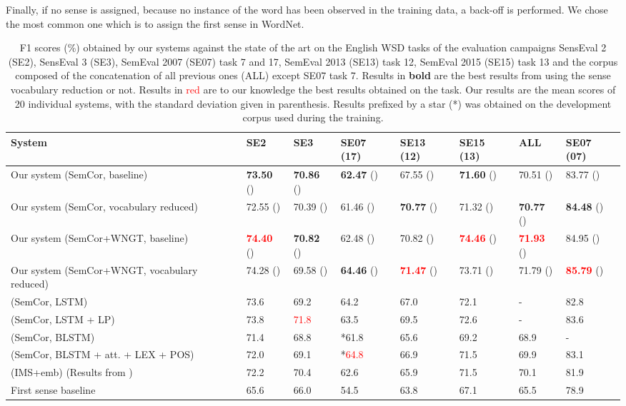\documentclass[11pt,a4paper]{article}
\newcommand{\tbf}[1]{\textbf{#1}}
\begin{document}
Finally, if no sense is assigned, because no instance of the word has been observed in the training data, a back-off is performed. We chose the most common one which is to assign the first sense in WordNet. 

\begin{table*}[htbp]
\small
\begin{center}
\tabulinesep=2pt
\begin{tabu} to \linewidth {X[5lm]X[1cm]X[1cm]X[1cm]X[1cm]X[1cm]X[1cm]X[1cm]} \toprule
System & SE2 & SE3 & SE07 (17) & SE13 (12) & SE15 (13) & ALL & SE07 (07)\\
\midrule
Our system (SemCor, baseline) & \tbf{73.50} () & \tbf{70.86} () & \tbf{62.47} () & 67.55 () & \tbf{71.60} () & 70.51 () & 83.77 ()\\
 Our system (SemCor, vocabulary reduced) & 72.55 () & 70.39 () & 61.46 () & \tbf{70.77} () & 71.32 () & \tbf{70.77} () & \tbf{84.48} () \\
\midrule
Our system (SemCor+WNGT, baseline) & \textcolor{red}{\tbf{74.40}} () & \tbf{70.82} () & 62.48 () & 70.82 () & \textcolor{red}{\tbf{74.46}} () & \textcolor{red}{\tbf{71.93}} () & 84.95 () \\
 Our system (SemCor+WNGT, vocabulary reduced) & 74.28 () & 69.58 () & \tbf{64.46} () & \textcolor{red}{\tbf{71.47}} () & 73.71 () & 71.79 () & \textcolor{red}{\tbf{85.79}} () \\
\midrule
\citep{yuan_2016} (SemCor, LSTM) & 73.6 & 69.2 & 64.2 & 67.0 & 72.1 & - & 82.8 \\
 \citep{yuan_2016} (SemCor, LSTM + LP) & 73.8 & \textcolor{red}{71.8} & 63.5 & 69.5 & 72.6 & - & 83.6 \\
\citep{raganato2017} (SemCor, BLSTM) & 71.4 & 68.8 & *61.8 & 65.6 & 69.2 & 68.9 & - \\
 \citep{raganato2017} (SemCor, BLSTM + att. + LEX + POS) & 72.0 & 69.1 & *\textcolor{red}{64.8} & 66.9 & 71.5 & 69.9 & 83.1 \\
\citep{iacobacci2016embeddings} (IMS+emb) (Results from \citet{raganato2017}) & 72.2 & 70.4 & 62.6 & 65.9 & 71.5 & 70.1 & 81.9 \\
\midrule
First sense baseline & 65.6 & 66.0 & 54.5 & 63.8 & 67.1 & 65.5 & 78.9\\
\bottomrule
\end{tabu}
\end{center}
\caption{F1 scores (\%) obtained by our systems against the state of the art on the English WSD tasks of the evaluation campaigns SensEval 2 (SE2), SensEval 3 (SE3), SemEval 2007 (SE07) task 7 and 17, SemEval 2013 (SE13) task 12, SemEval 2015 (SE15) task 13 and the corpus composed of the concatenation of all previous ones (ALL) except SE07 task 7. Results in \tbf{bold} are the best results from using the sense vocabulary reduction or not. Results in \textcolor{red}{red} are to our knowledge the best results obtained on the task. Our results are the mean scores of 20 individual systems, with the standard deviation given in parenthesis. Results prefixed by a star (*) was obtained on the development corpus used during the training.}
\label{tab:scores}
\end{table*}
\end{document}

